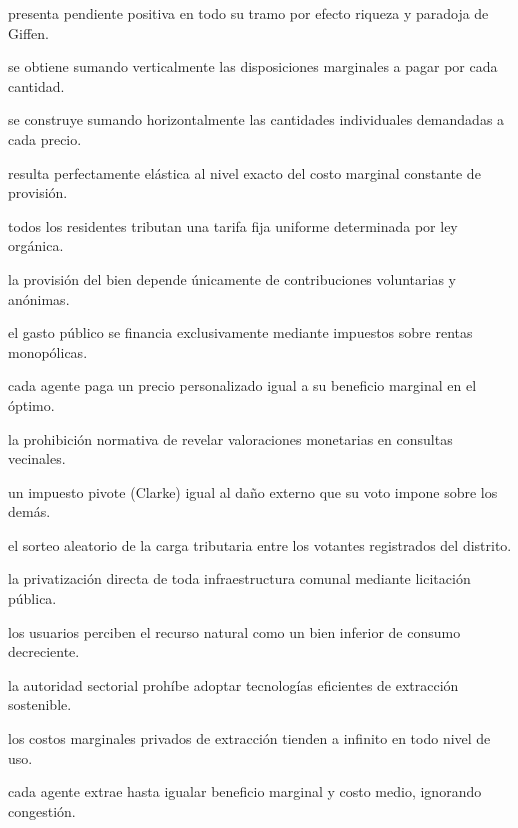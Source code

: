 \begin{opts}
    \item presenta pendiente positiva en todo su tramo por efecto riqueza y paradoja de Giffen.
    \item se obtiene sumando verticalmente las disposiciones marginales a pagar por cada cantidad.
    \item se construye sumando horizontalmente las cantidades individuales demandadas a cada precio.
    \item resulta perfectamente elástica al nivel exacto del costo marginal constante de provisión.
\end{opts}

\begin{opts}
    \item todos los residentes tributan una tarifa fija uniforme determinada por ley orgánica.
    \item la provisión del bien depende únicamente de contribuciones voluntarias y anónimas.
    \item el gasto público se financia exclusivamente mediante impuestos sobre rentas monopólicas.
    \item cada agente paga un precio personalizado igual a su beneficio marginal en el óptimo.
\end{opts}

\begin{opts}
    \item la prohibición normativa de revelar valoraciones monetarias en consultas vecinales.
    \item un impuesto pivote (Clarke) igual al daño externo que su voto impone sobre los demás.
    \item el sorteo aleatorio de la carga tributaria entre los votantes registrados del distrito.
    \item la privatización directa de toda infraestructura comunal mediante licitación pública.
\end{opts}

\begin{opts}
    \item los usuarios perciben el recurso natural como un bien inferior de consumo decreciente.
    \item la autoridad sectorial prohíbe adoptar tecnologías eficientes de extracción sostenible.
    \item los costos marginales privados de extracción tienden a infinito en todo nivel de uso.
    \item cada agente extrae hasta igualar beneficio marginal y costo medio, ignorando congestión.
\end{opts}

